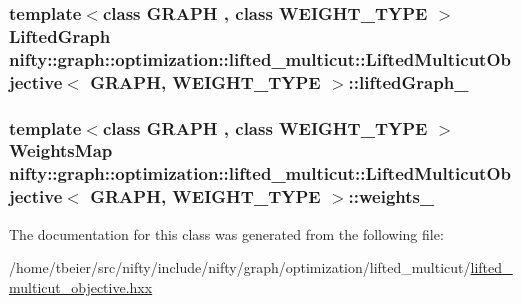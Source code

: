 \subsubsection[{lifted\+Graph\+\_\+}]{\setlength{\rightskip}{0pt plus 5cm}template$<$class G\+R\+A\+P\+H , class W\+E\+I\+G\+H\+T\+\_\+\+T\+Y\+P\+E $>$ {\bf Lifted\+Graph} {\bf nifty\+::graph\+::optimization\+::lifted\+\_\+multicut\+::\+Lifted\+Multicut\+Objective}$<$ G\+R\+A\+P\+H, W\+E\+I\+G\+H\+T\+\_\+\+T\+Y\+P\+E $>$\+::lifted\+Graph\+\_\+\hspace{0.3cm}{\ttfamily [protected]}}\label{classnifty_1_1graph_1_1optimization_1_1lifted__multicut_1_1LiftedMulticutObjective_a8acce81832827e80a0b11bad67773a1f}
\hypertarget{classnifty_1_1graph_1_1optimization_1_1lifted__multicut_1_1LiftedMulticutObjective_af5a2a0c62151d1e838995fae929e8a46}{}
\subsubsection[{weights\+\_\+}]{\setlength{\rightskip}{0pt plus 5cm}template$<$class G\+R\+A\+P\+H , class W\+E\+I\+G\+H\+T\+\_\+\+T\+Y\+P\+E $>$ {\bf Weights\+Map} {\bf nifty\+::graph\+::optimization\+::lifted\+\_\+multicut\+::\+Lifted\+Multicut\+Objective}$<$ G\+R\+A\+P\+H, W\+E\+I\+G\+H\+T\+\_\+\+T\+Y\+P\+E $>$\+::weights\+\_\+\hspace{0.3cm}{\ttfamily [protected]}}\label{classnifty_1_1graph_1_1optimization_1_1lifted__multicut_1_1LiftedMulticutObjective_af5a2a0c62151d1e838995fae929e8a46}


The documentation for this class was generated from the following file\+:\begin{DoxyCompactItemize}
\item 
/home/tbeier/src/nifty/include/nifty/graph/optimization/lifted\+\_\+multicut/\hyperlink{graph_2optimization_2lifted__multicut_2lifted__multicut__objective_8hxx}{lifted\+\_\+multicut\+\_\+objective.\+hxx}\end{DoxyCompactItemize}
